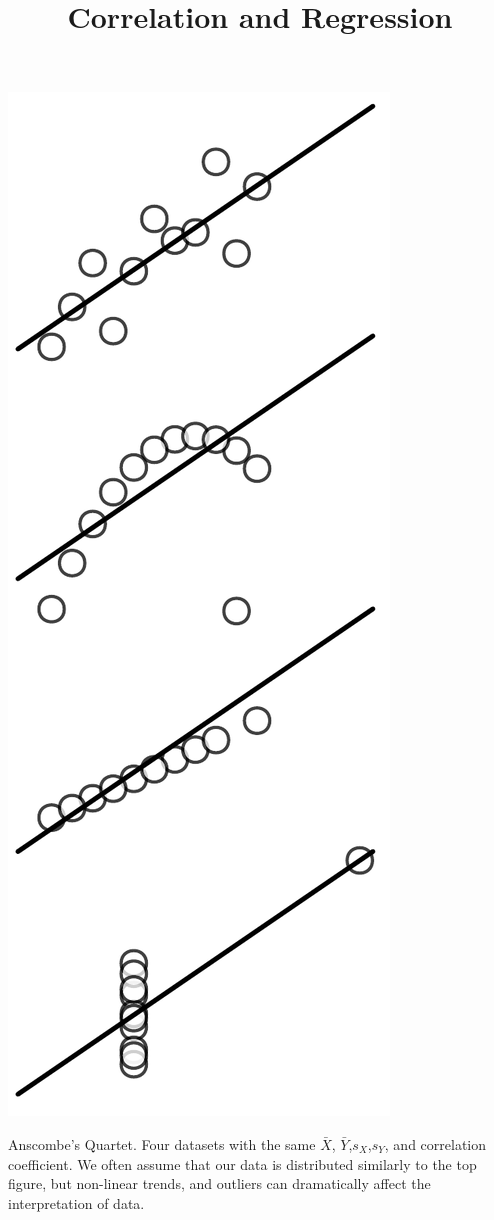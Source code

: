 \documentclass{tufte-handout}
\title{Correlation and Regression}
\date{} %
\begin{document}
\maketitle%

\begin{marginfigure}[10pt]
  \includegraphics[width=\linewidth]{handout8_anscombe}%
  \label{fig:fullfig}%
\caption{Anscombe's Quartet. Four datasets with the same $\bar{X}$, $\bar{Y}$,$s_X$,$s_Y$, and correlation coefficient. We often assume that our data is distributed similarly to the top figure, but non-linear trends, and outliers can dramatically affect the interpretation of data.}
\end{marginfigure}
\end{document}
